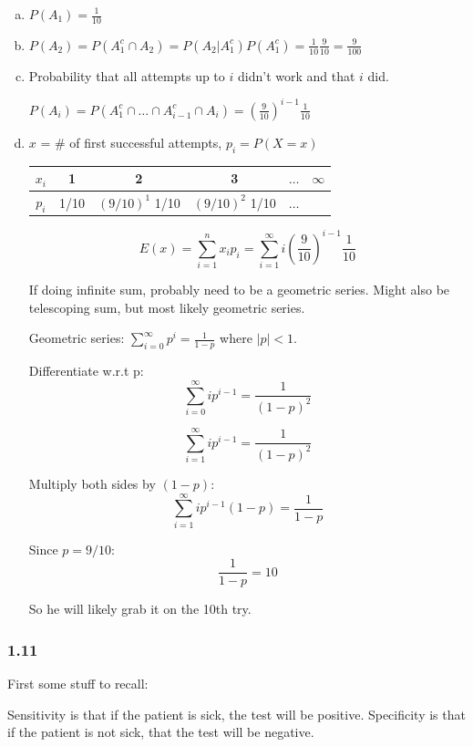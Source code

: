 \documentclass{report}
\begin{document}
\begin{enumerate}[(a)]
\item $P(A_1) = \frac{1}{10}$
\item $P(A_2) = P(A_1^c \cap A_2) = P(A_2|A_1^c) P(A_1^c) = \frac{1}{10} \frac{9}{10} = \frac{9}{100}$


\item Probability that all attempts up to $i$ didn't work and that $i$ did. 

$P(A_i) = P(A_1^c \cap \dots \cap A_{i-1}^c \cap A_i) = (\frac{9}{10})^{i-1} \frac{1}{10}$

\item  $x$ = \# of first successful attempts, $p_i = P(X = x)$

\begin{table}[H]
\centering
\begin{tabular}{c|ccccc}
\toprule
$x_i$ & 1 & 2 & 3 & $\dots$ & $\infty$ \\
\midrule
$p_i$ & 1/10 & $(9/10)^1$ 1/10 & $(9/10)^2$ 1/10 & $\dots$ & \\
\bottomrule
\end{tabular}
\end{table}

$$
E(x) = \sum_{i=1}^n x_i p_i = \sum_{i=1}^{\infty} i \left(\frac{9}{10}\right)^{i-1} \frac{1}{10}
$$

If doing infinite sum, probably need to be a geometric series. Might also be telescoping sum, but most likely geometric series.

Geometric series: $\sum_{i=0}^{\infty} p^i = \frac{1}{1-p}$ where $|p|<1$.

Differentiate w.r.t p: $$\sum_{i=0}^{\infty} i p^{i-1} = \frac{1}{(1-p)^2} $$

 $$\sum_{i=1}^{\infty} i p^{i-1} = \frac{1}{(1-p)^2} $$

Multiply both sides by $(1-p)$:  $$\sum_{i=1}^{\infty} i p^{i-1} (1-p) = \frac{1}{1-p} $$

Since $p=9/10$: $$\frac{1}{1-p} = 10 $$

So he will likely grab it on the 10th try.


\end{enumerate}

\subsubsection*{1.11}

First some stuff to recall: 

 Sensitivity is that if the patient is sick, the test will be positive. Specificity is that if the patient is not sick, that the test will be negative.
 
\end{document}

